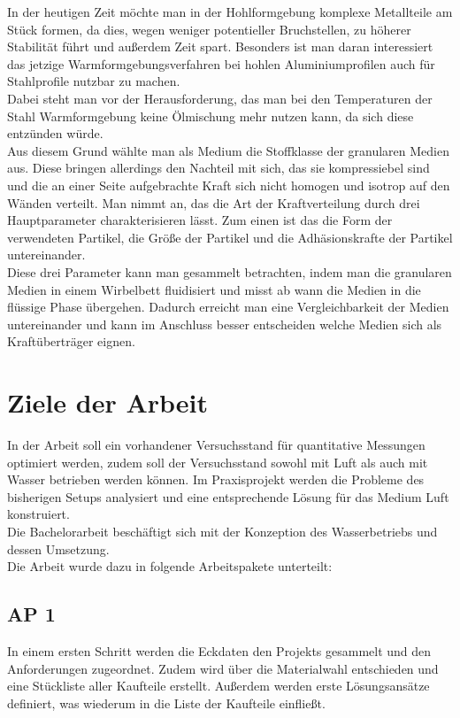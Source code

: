 In der heutigen Zeit möchte man in der Hohlformgebung komplexe Metallteile am Stück formen, da dies, wegen weniger potentieller Bruchstellen, zu höherer Stabilität führt und außerdem Zeit spart. Besonders ist man daran interessiert das jetzige Warmformgebungsverfahren bei hohlen Aluminiumprofilen auch für Stahlprofile nutzbar zu machen. \\
Dabei steht man vor der Herausforderung, das man bei den Temperaturen der Stahl Warmformgebung keine Ölmischung mehr nutzen kann, da sich diese entzünden würde. \\
Aus diesem Grund wählte man als Medium die Stoffklasse der granularen Medien aus. Diese bringen allerdings den Nachteil mit sich, das sie kompressiebel sind und die an einer Seite aufgebrachte Kraft sich nicht homogen und isotrop auf den Wänden verteilt. 
Man nimmt an, das die Art der Kraftverteilung durch drei Hauptparameter charakterisieren lässt. Zum einen ist das die Form der verwendeten Partikel, die Größe der Partikel und die Adhäsionskrafte der Partikel untereinander. \\
Diese drei Parameter kann man gesammelt betrachten, indem man die granularen Medien in einem Wirbelbett fluidisiert und misst ab wann die Medien in die flüssige Phase übergehen. Dadurch erreicht man eine Vergleichbarkeit der Medien untereinander und kann im Anschluss besser entscheiden welche Medien sich als Kraftüberträger eignen. \\


\section{Ziele der Arbeit}

In der Arbeit soll ein vorhandener Versuchsstand für quantitative Messungen optimiert werden, zudem soll der Versuchsstand sowohl mit Luft als auch mit Wasser betrieben werden können. Im Praxisprojekt werden die Probleme des bisherigen Setups analysiert und eine entsprechende Lösung für das Medium Luft konstruiert. \\ 
Die Bachelorarbeit beschäftigt sich mit der Konzeption des Wasserbetriebs und dessen Umsetzung. \\
Die Arbeit wurde dazu in folgende Arbeitspakete unterteilt:


\subsection{AP 1}

In einem ersten Schritt werden die Eckdaten den Projekts gesammelt und den Anforderungen zugeordnet. Zudem wird über die Materialwahl entschieden und eine Stückliste aller Kaufteile erstellt. Außerdem werden erste Lösungsansätze definiert, was wiederum in die Liste der Kaufteile einfließt.


